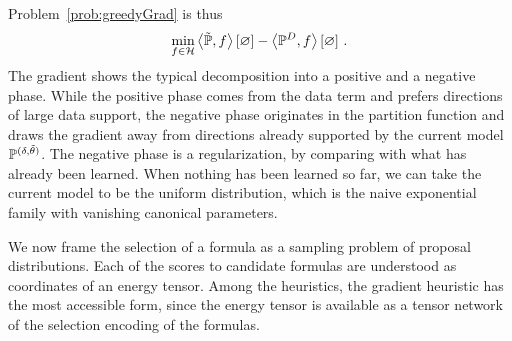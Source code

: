 Problem~\eqref{prob:greedyGrad} is thus
\begin{align}
    \min_{f\in\mathcal{H}} \left\langle \tilde{\mathbb{P}},f\right\rangle \left[ \varnothing \right] - \left\langle \mathbb{P}^{D},f\right\rangle \left[ \varnothing \right]   \, .
\end{align}
The gradient shows the typical decomposition into a positive and a negative phase.
While the positive phase comes from the data term and prefers directions of large data support, the negative phase originates in the partition function and draws the gradient away from directions already supported by the current model $\mathbb{P}^{(\delta, \tilde{\theta})}$.
The negative phase is a regularization, by comparing with what has already been learned.
When nothing has been learned so far, we can take the current model to be the uniform distribution, which is the naive exponential family with vanishing canonical parameters.







We now frame the selection of a formula as a sampling problem of proposal distributions.
Each of the scores to candidate formulas are understood as coordinates of an energy tensor.
Among the heuristics, the gradient heuristic has the most accessible form, since the energy tensor is available as a tensor network of the selection encoding of the formulas.



